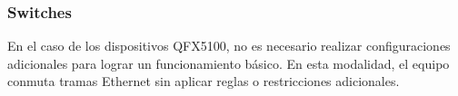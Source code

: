 \documentclass[%
    school=etsisi,%
    degree=61TI,%
]{upm-report}
\begin{document}
\subsubsection{Switches}

En el caso de los dispositivos QFX5100, no es necesario realizar configuraciones adicionales para lograr un funcionamiento básico. En esta modalidad, el equipo conmuta tramas Ethernet sin aplicar reglas o restricciones adicionales.
\end{document}
